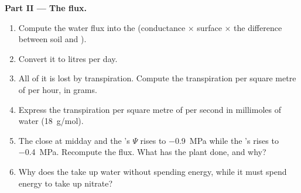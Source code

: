 \begin{problem}
\medskip
\noindent\textbf{Part II --- The flux.}
\begin{enumerate}[resume]
  \item Compute the water flux into the  (conductance $\times$
        surface $\times$ the difference between soil and  ).
  \item Convert it to litres per day.
  \item All of it is lost by transpiration. Compute the transpiration
        per square metre of  per hour, in grams.
  \item Express the transpiration per square metre of  per second
        in millimoles of water (\qty{18}{g/mol}).
  \item The  close at midday and the 's $\Psi$ rises to
        \qty{-0.9}{MPa} while the 's rises to \qty{-0.4}{MPa}.
        Recompute the flux. What has the plant done, and why?
  \item Why does the  take up water without spending energy,
        while it must spend energy to take up nitrate?
\end{enumerate}


\end{problem}
